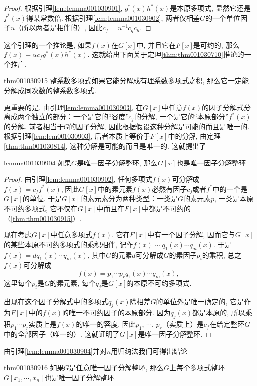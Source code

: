 \begin{proof}
根据引理\ref{lem:lemma001030901}, $g^*(x)h^*(x)$是本原多项式, 显然它还是$f^*(x)$得某常数倍. 根据引理\ref{lem:lemma001030902}, 两者仅相差$G$的一个单位因子$u$（所以两者是相伴的）, 因此$c_f = u^{-1}c_gc_h$. 
\end{proof}

这个引理的一个推论是, 如果$f(x)$在$G[x]$中, 并且它在$F[x]$是可约的, 那么$f(x)=uc_fg^*(x)h^*(x)$. 这就给出下面关于定理\ref{thm:thm001030710}推论的一个推广. 
\begin{theorem}{}{thm001030915}
整系数多项式如果它能分解成有理系数多项式之积, 那么它一定能分解成同次数的整系数多项式. 
\end{theorem}

更重要的是, 由引理\ref{lem:lemma001030903}, 在$G[x]$中任意$f(x)$的因子分解式分离成两个独立的部分：一个是它的“容度”$c_f$的分解, 一个是它的“本原部分”$f^*(x)$的分解. 前者相当于$G$的因子分解, 因此根据假设这种分解是可能的而且是唯一的. 根据引理\ref{lem:lem001030903}, 后者本质上等价于$F[x]$中的分解, 由定理\ref{thm:thm001030814}, 这种分解是可能的而且是唯一的. 这就提出了
\begin{lemma}{}{lemma001030904}
如果$G$是唯一因子分解整环, 那么$G[x]$也是唯一因子分解整环. 
\end{lemma}

\begin{proof}
由引理\ref{lem:lemma001030902}, 任何多项式$f(x)$可分解成$f(x)=c_ff^*(x)$, 因此$G[x]$中的素元素$f(x)$必然有因子$c_f$或者$f^*$中的一个是$G[x]$的单位. 于是$G[x]$的素元素分为两种类型：一类是$G$的素元素$p$, 一类是本原不可约多项式, 它不仅在$G[x]$中而且在$F[x]$中都是不可约的（\ref{thm:thm001030915}）. 

现在考虑$G[x]$中任意多项式$f(x)$. 它在$F[x]$中有一个因子分解, 因而它与$G[x]$的某些本原不可约多项式的乘积相伴, 记作$f(x)\sim q_1(x)\cdots q_m(x)$. 于是$f(x)=dq_1(x)\cdots q_m(x)$, 其中$G$的元素$d$可分解成$G$的素因子$p_i$的乘积, 总之$f(x)$可分解成
\[
f(x)=p_1 \cdots p_rq_1(x)\cdots q_m(x),
\]
这里每个$p_i$是$G$的素元素, 每个$q_j$是$G[x]$的本原不可约多项式. 

出现在这个因子分解式中的多项式$q_j(x)$除相差$G$的单位外是唯一确定的, 它是作为$F[x]$中的$f(x)$的唯一不可约因子的本原部分. 因为$q_j(x)$都是本原的, 所以乘积$p_1 \cdots p_r$实质上是$f(x)$的唯一的容度. 因此$p_1$, $\cdots$, $p_r$（实质上）是$c_f$在给定整环$G$中的全部因子（唯一的）. 这就证明了$G[x]$是唯一因子分解整环. 
\end{proof}

由引理\ref{lem:lemma001030904}并对$n$用归纳法我们可得出结论
\begin{theorem}{}{thm001030916}
如果$G$是任意唯一因子分解整环, 那么$G$上每个多项式整环$G[x_1, \cdots, x_n]$也是唯一因子分解整环. 
\end{theorem}

